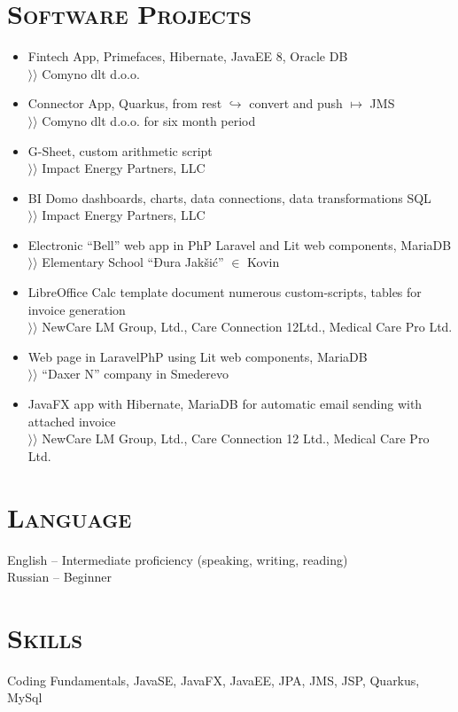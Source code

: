 \documentclass{article}
\begin{document}
\section{\textsc{Software Projects}}

\begin{itemize}
\item  Fintech App, Primefaces, Hibernate, JavaEE 8, Oracle DB\\
$\rangle\!\rangle$ Comyno dlt d.o.o.
\item Connector App, Quarkus, from rest $\hookrightarrow$ convert and push $\mapsto$ JMS\\
$\rangle\!\rangle$ Comyno dlt d.o.o. for six month period
\item G-Sheet, custom arithmetic script\\
$\rangle\!\rangle$ Impact Energy Partners, LLC
\item BI Domo dashboards, charts, data connections, data transformations SQL\\
$\rangle\!\rangle$ Impact Energy Partners, LLC
\item Electronic ``Bell'' web app in PhP Laravel and Lit web components, MariaDB\\
$\rangle\!\rangle$ Elementary School ``Đura Jakšić''  $\in$ Kovin
\item LibreOffice Calc template document numerous custom-scripts, tables for invoice generation\\ 
$\rangle\!\rangle$ NewCare LM Group, Ltd., Care Connection 12Ltd., Medical Care Pro Ltd.
\item Web page in LaravelPhP using Lit web components, MariaDB\\
$\rangle\!\rangle$ ``Daxer N'' company in Smederevo
\item JavaFX app with Hibernate, MariaDB for automatic email sending with attached invoice\\
$\rangle\!\rangle$ NewCare LM Group, Ltd., Care Connection 12 Ltd., Medical Care Pro Ltd.
\end{itemize}

\section{\textsc{Language}}

English  -- Intermediate proficiency (speaking, writing, reading)\\
Russian -- Beginner

\section{\textsc{Skills}}

Coding Fundamentals, JavaSE, JavaFX, JavaEE, JPA, JMS, JSP,  Quarkus, MySql
\end{document}

